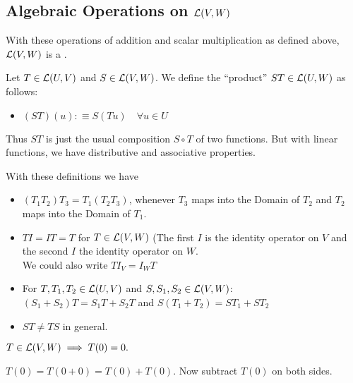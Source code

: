 \subsection{Algebraic Operations on $\mathcal{L}(V,W)$}
\setcounter{thm}{5}
\begin{thm} [$\lvw$]
  With these operations of addition and scalar multiplication as defined above, $\lvw$ is a \vs.
\end{thm}

\setcounter{thm}{6}
\begin{mydef}
  Let $T \in {\mathcal{L}(U, V)}$ and $S \in {\mathcal{L}(V, W)}$. We define the ``product'' $ST \in {\mathcal{L}(U, W)}$ as follows:
  \begin{itemize}
    \item[] $(ST)(u) :\equiv S(Tu) \quad \forall u \in U$
  \end{itemize}
  Thus $ST$ is just the usual composition  $S \circ T$ of two functions. But with linear functions, we have distributive and associative properties. 
\end{mydef}

\begin{thm} 
  With these definitions we have
  \begin{itemize}
    \item {} $(T_1 T_2) T_3 = T_1 (T_2 T_3)$, whenever $T_3$ maps into the Domain of $T_2$ and $T_2$ maps into the Domain of $T_1$.
    \item {} $T I = I T = T$ for $T \in {\mathcal{L}(V,W)}$ (The first $I$ is the identity operator on $V$ and the second $I$ the identity operator on $W$. \\
    We could also write $T I_V = I_W T$
    \item {} For $T, T_1, T_2 \in {\mathcal{L}(U, V)}$ and $S, S_1, S_2 \in {\mathcal{L}(V, W)}$: \\ $(S_1 + S_2)T=S_1 T + S_2 T$ and $S(T_1 + T_2)=S T_1 + S T_2$
    \item {} $ST \neq TS$ in general.
  \end{itemize}
\end{thm}

\setcounter{thm}{9}
\begin{thm} 
  $T\in {\mathcal{L}(V,W)} \implies T(0)=0.$
\end{thm}
\begin{prf}
  $T(0) = T(0+0) = T(0) + T(0)$. Now subtract $T(0)$ on both sides.
\end{prf}